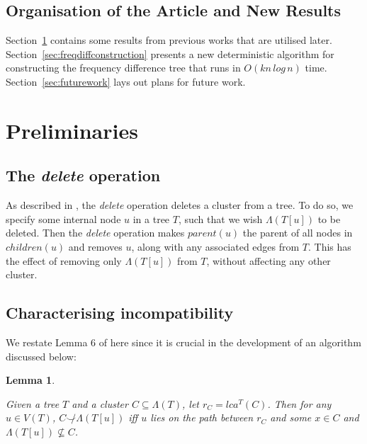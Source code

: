 \documentclass{article}
\newcommand{\compatible}{\smile}
\newcommand{\leafset}{\Lambda}
\newtheorem{incompatibility}{Lemma}
\begin{document}
    \subsection{Organisation of the Article and New Results}
    Section~\ref{sec:preliminaries} contains some results from previous works that are utilised later. Section~\ref{sec:freqdiffconstruction} presents a new deterministic algorithm for constructing the frequency difference tree that runs in $O(kn\,log\,n)$ time. Section~\ref{sec:futurework} lays out plans for future work.

    \section{Preliminaries}
    \label{sec:preliminaries}

    \subsection{The \textit{delete} operation}
    As described in \cite{jansson2018algorithms}, the \textit{delete} operation deletes a cluster from a tree. To do so, we specify some internal node $u$ in a tree $T$, such that we wish $\leafset(T[u])$ to be deleted. Then the \textit{delete} operation makes $parent(u)$ the parent of all nodes in $children(u)$ and removes $u$, along with any associated edges from $T$. This has the effect of removing only $\leafset(T[u])$ from $T$, without affecting any other cluster.

    \subsection{Characterising incompatibility}
    We restate Lemma 6 of \cite{jansson2018algorithms} here since it is crucial in the development of an algorithm discussed below:
    \newline

    \begin{incompatibility}
        \label{lem:incompatibility}

        Given a tree $T$ and a cluster $C \subseteq \leafset(T)$, let $r_C = lca^T(C)$. Then for any $u \in V(T)$, $C \not\compatible \leafset(T[u])$ iff $u$ lies on the path between $r_C$ and some $x \in C$ and $\leafset(T[u]) \not\subseteq C$.
    \end{incompatibility}
\end{document}
